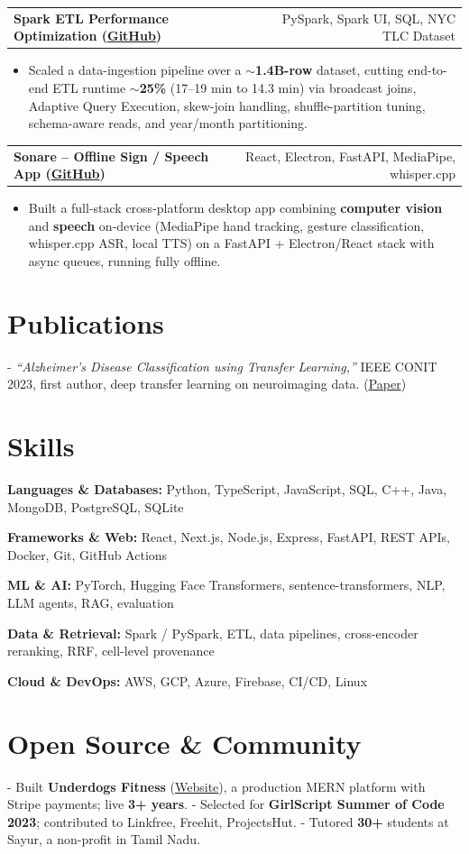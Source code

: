 \documentclass[letterpaper,11pt]{article}
\makeatletter
\newcommand{\projItem}[2]{%
  \vspace{2pt}
  \begin{tabular*}{\textwidth}{@{}l@{\extracolsep{\fill}}r@{}}
    \textbf{#1} & #2 \\
  \end{tabular*}\par\vspace{-3pt}
}
\newcommand{\skillLine}[2]{\textbf{#1:} #2\par\vspace{1.5pt}}
\newcommand{\inlineBlock}[1]{{\setlength{\leftskip}{0.18in}\small #1\par}}
\makeatother
\begin{document}
\projItem{Spark ETL Performance Optimization {\normalfont\small(\href{https://github.com/Deva-1903/Spark-ETL-Optimization}{GitHub})}}{PySpark, Spark UI, SQL, NYC TLC Dataset}
\begin{itemize}
  \item Scaled a data-ingestion pipeline over a \textbf{$\sim$1.4B-row} dataset, cutting end-to-end ETL runtime \textbf{$\sim$25\%} (17--19 min to 14.3 min) via broadcast joins, Adaptive Query Execution, skew-join handling, shuffle-partition tuning, schema-aware reads, and year/month partitioning.
\end{itemize}

\projItem{Sonare -- Offline Sign / Speech App {\normalfont\small(\href{https://github.com/Deva-1903/Qualcomm-Sep25-Team-Sonare}{GitHub})}}{React, Electron, FastAPI, MediaPipe, whisper.cpp}
\begin{itemize}
  \item Built a full-stack cross-platform desktop app combining \textbf{computer vision} and \textbf{speech} on-device (MediaPipe hand tracking, gesture classification, whisper.cpp ASR, local TTS) on a FastAPI + Electron/React stack with async queues, running fully offline.
\end{itemize}

\section{Publications}
\vspace{2pt}
\inlineBlock{- \textit{``Alzheimer's Disease Classification using Transfer Learning,''} IEEE CONIT 2023, first author, deep transfer learning on neuroimaging data. {\normalfont\small(\href{https://ieeexplore.ieee.org/document/10205760}{Paper})}}

\section{Skills}
\skillLine{Languages \& Databases}{Python, TypeScript, JavaScript, SQL, C++, Java, MongoDB, PostgreSQL, SQLite}
\skillLine{Frameworks \& Web}{React, Next.js, Node.js, Express, FastAPI, REST APIs, Docker, Git, GitHub Actions}
\skillLine{ML \& AI}{PyTorch, Hugging Face Transformers, sentence-transformers, NLP, LLM agents, RAG, evaluation}
\skillLine{Data \& Retrieval}{Spark / PySpark, ETL, data pipelines, cross-encoder reranking, RRF, cell-level provenance}
\skillLine{Cloud \& DevOps}{AWS, GCP, Azure, Firebase, CI/CD, Linux}

\section{Open Source \& Community}
\inlineBlock{- Built \textbf{Underdogs Fitness} (\href{https://www.underdogsfitness.in/}{Website}), a production MERN platform with Stripe payments; live \textbf{3+ years}. - Selected for \textbf{GirlScript Summer of Code 2023}; contributed to Linkfree, Freehit, ProjectsHut. - Tutored \textbf{30+} students at Sayur, a non-profit in Tamil Nadu.}
\end{document}
